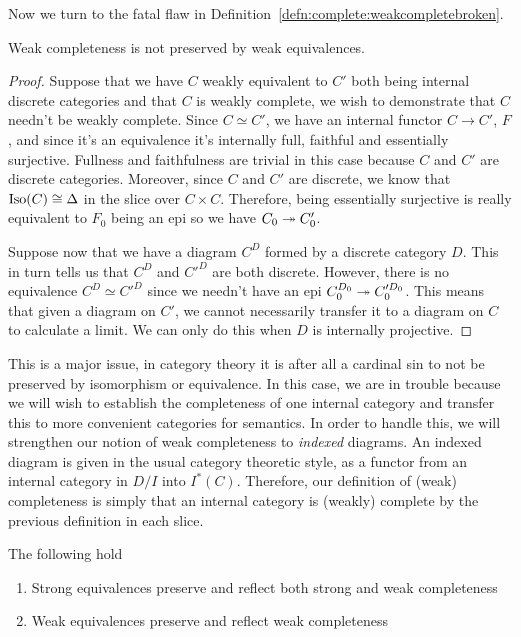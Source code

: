 Now we turn to the fatal flaw in
Definition~\ref{defn:complete:weakcompletebroken}.
\begin{thm}\label{thm:complete:weakcompletenotpreserved}
  Weak completeness is not preserved by weak equivalences.
\end{thm}
\begin{proof}
  Suppose that we have $C$ weakly equivalent to $C'$ both being
  internal discrete categories and that $C$ is weakly complete, we
  wish to demonstrate that $C$ needn't be weakly complete. Since
  $C \simeq C'$, we have an internal functor $C \to C'$, $F$, and
  since it's an equivalence it's internally full, faithful and
  essentially surjective. Fullness and faithfulness are trivial in
  this case because $C$ and $C'$ are discrete categories. Moreover,
  since $C$ and $C'$ are discrete, we know that
  $\operatorname{Iso}(C) \cong \Delta$ in the slice over $C \times C$. Therefore,
  being essentially surjective is really equivalent to $F_0$ being an
  epi so we have $C_0 \twoheadrightarrow C'_0$.

  Suppose now that we have a diagram $C^D$ formed by a discrete
  category $D$. This in turn tells us that $C^D$ and $C'^D$ are both
  discrete. However, there is no equivalence $C^D \simeq C'^D$ since
  we needn't have an epi $C_0^{D_0} \twoheadrightarrow C_0'^{D_0}$. This means that
  given a diagram on $C'$, we cannot necessarily transfer it to a
  diagram on $C$ to calculate a limit. We can only do this when $D$ is
  internally projective.
\end{proof}
This is a major issue, in category theory it is after all a cardinal
sin to not be preserved by isomorphism or equivalence. In this case,
we are in trouble because we will wish to establish the completeness
of one internal category and transfer this to more convenient
categories for semantics. In order to handle this, we will strengthen
our notion of weak completeness to \emph{indexed} diagrams. An indexed
diagram is given in the usual category theoretic style, as a functor
from an internal category in $D/I$ into $I^*(C)$. Therefore, our
definition of (weak) completeness is simply that an internal category
is (weakly) complete by the previous definition in each slice.
\begin{thm}\label{thm:complete:preservation}
  The following hold
  \begin{enumerate}
  \item Strong equivalences preserve and reflect both strong and weak
    completeness
  \item Weak equivalences preserve and reflect weak completeness
  \end{enumerate}
\end{thm}
